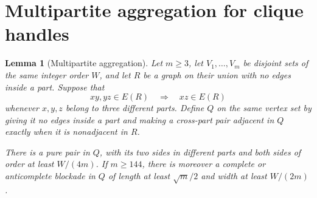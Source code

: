 \documentclass[11pt]{article}
\numberwithin{equation}{section}
\theoremstyle{plain}
\newtheorem{lemma}[theorem]{Lemma}
\theoremstyle{definition}
\begin{document}
\section{Multipartite aggregation for clique handles}
\label{sec:multipartite}

\begin{lemma}[Multipartite aggregation]
\label{lem:f124-no-two-edge-aggregation}
Let $m\geq3$, let $V_1,\ldots,V_m$ be disjoint sets of the same integer
order $W$, and let $R$ be a graph on their union with no edges inside a
part.  Suppose that
\[
 xy,yz\in E(R)\quad\Longrightarrow\quad xz\in E(R)
 \tag{A}\label{eq:multipartite-transitivity}
\]
whenever $x,y,z$ belong to three different parts.  Define $Q$ on the
same vertex set by giving it no edges inside a part and making a
cross-part pair adjacent in $Q$ exactly when it is nonadjacent in $R$.

There is a pure pair in $Q$, with its two sides in different parts and
both sides of order at least $W/(4m)$.  If $m\geq144$, there is moreover
a complete or anticomplete blockade in $Q$ of length at least
$\sqrt m/2$ and width at least $W/(2m)$.
\end{lemma}
\end{document}
